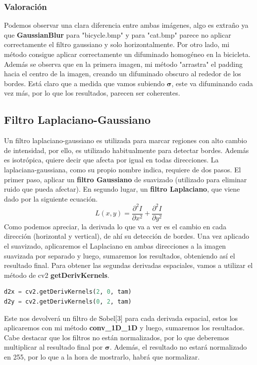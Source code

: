 \documentclass{article}
\begin{document}
\newpage

\subsubsection{Valoración}
Podemos observar una clara diferencia entre ambas imágenes, algo es extraño ya que \textbf{GaussianBlur} para "bicycle.bmp" y para "cat.bmp" parece no aplicar correctamente el filtro gaussiano y solo horizontalmente. Por otro lado, mi método consigue aplicar correctamente un difuminado homogéneo en la bicicleta. Además se observa que en la primera imagen, mi método "arrastra" el padding hacia el centro de la imagen, creando un difuminado obscuro al rededor de los bordes. Está claro que a medida que vamos subiendo $\boldsymbol{\sigma}$, este va difuminando cada vez más, por lo que los resultados, parecen ser coherentes.

\subsection{Filtro Laplaciano-Gaussiano}
Un filtro laplaciano-gaussiano es utilizada para marcar regiones con alto cambio de intensidad, por ello, es utilizado habitualmente para detectar bordes. Además es isotrópica, quiere decir que afecta por igual en todas direcciones.
\newline
\newline
La laplaciana-gaussiana, como su propio nombre indica, requiere de dos pasos. El primer paso, aplicar un \textbf{filtro Gaussiano} de suavizado (utilizado para eliminar ruido que pueda afectar). En segundo lugar, un \textbf{filtro Laplaciano}, que viene dado por la siguiente ecuación.
$$ L(x, y) = \dfrac{\partial^2I}{\partial x^2} + \dfrac{\partial^2I}{\partial y^2}$$
Como podemos apreciar, la derivada lo que va a ver es el cambio en cada dirección (horizontal y vertical), de ahí su detección de bordes.
\newline
\newline
Una vez aplicado el suavizado, aplicaremos el Laplaciano en ambas direcciones a la imagen suavizada por separado y luego, sumaremos los resultados, obteniendo así el resultado final.
\newline
\newline
Para obtener las segundas derivadas espaciales, vamos a utilizar el método de cv2 \textbf{getDerivKernels}.
\begin{lstlisting}[language=Python]
d2x = cv2.getDerivKernels(2, 0, tam)
d2y = cv2.getDerivKernels(0, 2, tam)
\end{lstlisting}
Este nos devolverá un filtro de Sobel[3] para cada derivada espacial, estos los aplicaremos con mi método \textbf{conv\_1D\_1D} y luego, sumaremos los resultados.
\newline
\newline
Cabe destacar que los filtros no están normalizados, por lo que deberemos multiplicar al resultado final por $\boldsymbol{\sigma}$. Además, el resultado no estará normalizado en 255, por lo que a la hora de mostrarlo, habrá que normalizar.
\end{document}
